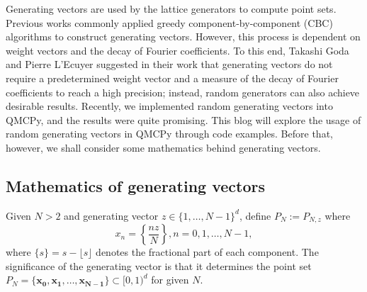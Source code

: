 Generating vectors are used by the lattice generators to compute point sets. Previous works \cite{Kor59,Slo02,KuoJoe02b,NuyCoo06a} commonly applied greedy component-by-component (CBC) algorithms to construct generating vectors. However, this process is dependent on weight vectors and the decay of Fourier coefficients. To this end, Takashi Goda and Pierre L'Ecuyer suggested in their work \cite{doi:10.1137/22M1473625} that generating vectors do not require a predetermined weight vector and a  measure of the decay of Fourier coefficients to reach a high precision; instead, random generators can also achieve desirable results. Recently, we implemented random generating vectors into QMCPy, and the results were quite promising. This blog will explore the usage of random generating vectors in QMCPy through code examples. Before that, however, we shall  consider some mathematics behind generating vectors. 

\subsection*{Mathematics of generating vectors}

Given $N>2$ and generating vector $z \in \{1,\dots,N-1\}^d$, define $P_N := P_{N,z}$ where 
\begin{equation*}
    x_n = \left\{\frac{nz}{N}\right\}, n = 0,1,\dots,N-1,
\end{equation*}
where $\{s\} = s-\lfloor s \rfloor$ denotes the fractional part of each component. The significance of the generating vector is that it determines the point set $P_N = \{\boldsymbol{x_0},\boldsymbol{x_1},\dots,\boldsymbol{x_{N-1}}\} \subset [0,1)^d$ for given $N$.  

